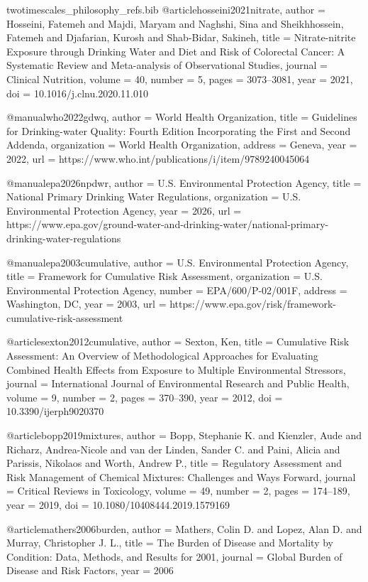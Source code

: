 \begin{filecontents*}{twotimescales_philosophy_refs.bib}
@article{hosseini2021nitrate,
  author  = {Hosseini, Fatemeh and Majdi, Maryam and Naghshi, Sina and Sheikhhossein, Fatemeh and Djafarian, Kurosh and Shab-Bidar, Sakineh},
  title   = {Nitrate-nitrite Exposure through Drinking Water and Diet and Risk of Colorectal Cancer: A Systematic Review and Meta-analysis of Observational Studies},
  journal = {Clinical Nutrition},
  volume  = {40},
  number  = {5},
  pages   = {3073--3081},
  year    = {2021},
  doi     = {10.1016/j.clnu.2020.11.010}
}

@manual{who2022gdwq,
  author       = {{World Health Organization}},
  title        = {Guidelines for Drinking-water Quality: Fourth Edition Incorporating the First and Second Addenda},
  organization = {World Health Organization},
  address      = {Geneva},
  year         = {2022},
  url          = {https://www.who.int/publications/i/item/9789240045064}
}

@manual{epa2026npdwr,
  author       = {{U.S. Environmental Protection Agency}},
  title        = {National Primary Drinking Water Regulations},
  organization = {U.S. Environmental Protection Agency},
  year         = {2026},
  url          = {https://www.epa.gov/ground-water-and-drinking-water/national-primary-drinking-water-regulations}
}

@manual{epa2003cumulative,
  author       = {{U.S. Environmental Protection Agency}},
  title        = {Framework for Cumulative Risk Assessment},
  organization = {U.S. Environmental Protection Agency},
  number       = {EPA/600/P-02/001F},
  address      = {Washington, DC},
  year         = {2003},
  url          = {https://www.epa.gov/risk/framework-cumulative-risk-assessment}
}

@article{sexton2012cumulative,
  author  = {Sexton, Ken},
  title   = {Cumulative Risk Assessment: An Overview of Methodological Approaches for Evaluating Combined Health Effects from Exposure to Multiple Environmental Stressors},
  journal = {International Journal of Environmental Research and Public Health},
  volume  = {9},
  number  = {2},
  pages   = {370--390},
  year    = {2012},
  doi     = {10.3390/ijerph9020370}
}

@article{bopp2019mixtures,
  author  = {Bopp, Stephanie K. and Kienzler, Aude and Richarz, Andrea-Nicole and van der Linden, Sander C. and Paini, Alicia and Parissis, Nikolaos and Worth, Andrew P.},
  title   = {Regulatory Assessment and Risk Management of Chemical Mixtures: Challenges and Ways Forward},
  journal = {Critical Reviews in Toxicology},
  volume  = {49},
  number  = {2},
  pages   = {174--189},
  year    = {2019},
  doi     = {10.1080/10408444.2019.1579169}
}

@article{mathers2006burden,
  author    = {Mathers, Colin D. and Lopez, Alan D. and Murray, Christopher J. L.},
  title     = {The Burden of Disease and Mortality by Condition: Data, Methods, and Results for 2001},
  journal   = {Global Burden of Disease and Risk Factors},
  year      = {2006}
}
\end{filecontents*}

